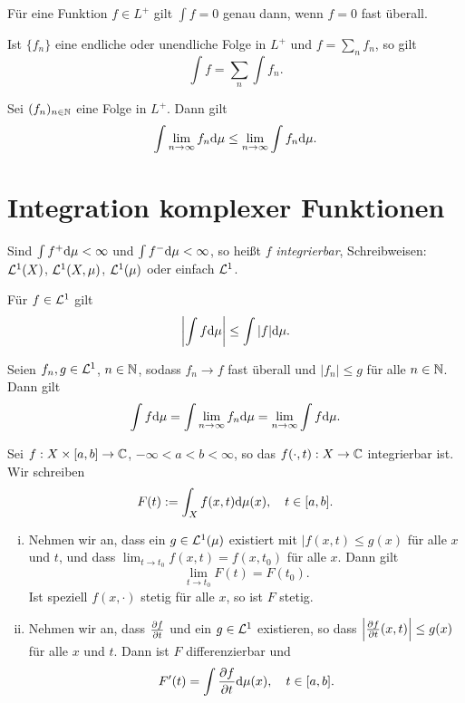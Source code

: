 \documentclass[
 a4paper,
 10pt,
 parskip=half
 ]{scrartcl}
\theoremstyle{plain}
\theoremstyle{definition}
\numberwithin{equation}{section}
\begin{document}
\begin{thm}
 Für eine Funktion $f \in L^+$ gilt $\int f = 0$ genau dann, wenn $f=0$ fast überall.
\end{thm}

\begin{thm}
 Ist $\{ f_n \}$ eine endliche oder unendliche Folge in $L^+$ und $f = \sum_n f_n$, so gilt
 \[ \int f =  \sum_n \int f_n. \]
\end{thm}

\begin{thm}
 Sei $(f_n)_{n \in \mathbb{N}}$ eine Folge in $L^+$. Dann gilt
 \[ \int \lim_{n \to \infty} f_n \mathrm{d} \mu \le \lim_{n \to \infty} \int f_n \mathrm{d} \mu. \]
\end{thm}

\section*{Integration komplexer Funktionen}
 Sind $\int f^+ \mathrm{d} \mu < \infty$ und $\int f^- \mathrm{d} \mu < \infty$, so
 heißt $f$ \emph{integrierbar}, Schreibweisen: $\mathcal{L}^1(X)$, $\mathcal{L}^1(X,\mu)$, $\mathcal{L}^1(\mu)$ oder einfach $\mathcal{L}^1$. 

\begin{lem}
 Für $f \in \mathcal{L}^1$ gilt
 \[ \left| \int f \mathrm{d} \mu \right| \le \int |f| \mathrm{d} \mu. \]
\end{lem}

\clearpage

\begin{thm}
 Seien $f_n, g \in \mathcal{L}^1$, $n \in \mathbb{N}$, sodass $f_n \to f$ fast überall und $|f_n| \le g$ für alle $n \in \mathbb{N}$. Dann gilt
 \[ \int f \mathrm{d} \mu = \int \lim_{n \to \infty} f_n \mathrm{d} \mu = \lim_{n \to \infty} \int f \mathrm{d} \mu. \]
\end{thm}

\begin{thm}
 Sei $f:X \times [a,b] \to \mathbb{C}$, $-\infty < a < b < \infty$, so das $f( \cdot, t ) : X \to \mathbb{C}$ integrierbar ist. Wir schreiben
 \[ F(t) := \int_X f( x, t ) \mathrm{d} \mu(x), \quad t \in [a,b]. \]
 \begin{enumerate}[(i)]
  \item Nehmen wir an, dass ein $g \in \mathcal{L}^1(\mu)$ existiert mit $|f(x,t) \le g(x)$ für alle $x$ und $t$, und dass $\lim_{t \to t_0} f(x,t) = f(x,t_0)$ für alle $x$. Dann gilt
  \[ \lim_{t \to t_0} F(t) = F(t_0). \]
  Ist speziell $f(x, \cdot)$ stetig für alle $x$, so ist $F$ stetig.
  \item Nehmen wir an, dass $\frac{\partial f}{\partial t}$ und ein $g \in \mathcal{L}^1$ existieren, so dass $\left| \frac{\partial f}{\partial t} (x,t) \right| \le g(x)$ für alle $x$ und $t$. Dann ist $F$ differenzierbar und 
  \[ F'(t) = \int \frac{\partial f}{\partial t} \mathrm{d} \mu(x), \quad t \in [a,b]. \]
 \end{enumerate}
\end{thm}
\end{document}
